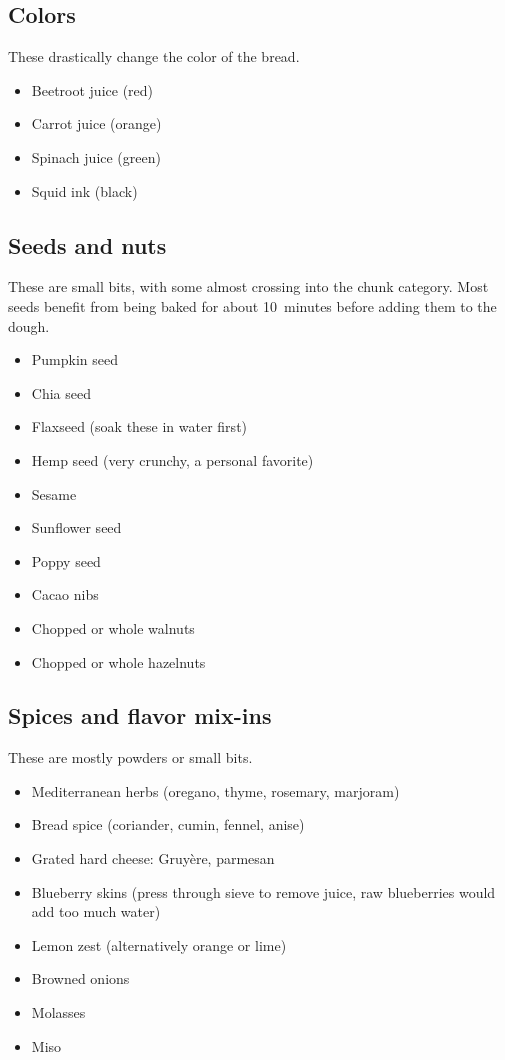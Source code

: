 \subsection{Colors}
These drastically change the color of the bread.
\begin{itemize}
  \item Beetroot juice (red)
  \item Carrot juice (orange)
  \item Spinach juice (green)
  \item Squid ink (black)
\end{itemize}

\subsection{Seeds and nuts}
These are small bits, with some almost crossing into the chunk category. Most
seeds benefit from being baked for about 10~minutes before adding them to the
dough.
\begin{itemize}
  \item Pumpkin seed
  \item Chia seed
  \item Flaxseed  (soak these in water first)
  \item Hemp seed (very crunchy, a personal favorite)
  \item Sesame
  \item Sunflower seed
  \item Poppy seed
  \item Cacao nibs
  \item Chopped or whole walnuts
  \item Chopped or whole hazelnuts
\end{itemize}

\subsection{Spices and flavor mix-ins}
These are mostly powders or small bits.
\begin{itemize}
  \item Mediterranean herbs (oregano, thyme, rosemary, marjoram)
  \item Bread spice (coriander, cumin, fennel, anise)
  \item Grated hard cheese: Gruyère, parmesan
  \item Blueberry skins (press through sieve to remove juice, raw blueberries
      would add too much water)
  \item Lemon zest (alternatively orange or lime)
  \item Browned onions
  \item Molasses
  \item Miso
\end{itemize}

